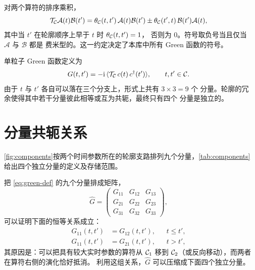 对两个算符的排序乘积，
\begin{equation}
    \mathcal{T}_{\mathcal{C}}\mathcal{A}(t)\mathcal{B}(t')
    =
    \theta_{\mathcal{C}}(t,t')\,\mathcal{A}(t)\mathcal{B}(t')
    \pm
    \theta_{\mathcal{C}}(t',t)\,\mathcal{B}(t')\mathcal{A}(t),
\end{equation}
其中当 $t'$ 在轮廓顺序上早于 $t$ 时 $\theta_{\mathcal{C}}(t,t')=1$，
否则为 $0$。符号取负号当且仅当 $\mathcal{A}$ 与 $\mathcal{B}$ 都是
费米型的。这一约定决定了本库中所有 Green 函数的符号。

单粒子 Green 函数定义为
\begin{equation}
    G(t,t') = -\mathrm{i}\,\langle \mathcal{T}_{\mathcal{C}}\,
              c(t)\,c^{\dagger}(t')\rangle,
    \qquad t,t'\in\mathcal{C} .
    \label{eq:green-def}
\end{equation}
由于 $t$ 与 $t'$ 各自可以落在三个分支上，形式上共有 $3\times3=9$ 个
分量。轮廓的冗余使得其中若干分量彼此相等或互为共轭，最终只有四个
分量是独立的。

\section{分量共轭关系}
\label{sec:components}

\cref{fig:components}按两个时间参数所在的轮廓支路排列九个分量，\cref{tab:components}给出四个独立分量的定义及存储范围。

把 \cref{eq:green-def} 的九个分量排成矩阵，
\begin{equation}
    \hat{G} =
    \begin{pmatrix}
        G_{11} & G_{12} & G_{13}\\
        G_{21} & G_{22} & G_{23}\\
        G_{31} & G_{32} & G_{33}
    \end{pmatrix},
\end{equation}
可以证明下面的恒等关系成立：
\begin{align}
    G_{11}(t,t') &= G_{12}(t,t'), && t\le t', \label{eq:redundancy1}\\
    G_{11}(t,t') &= G_{21}(t,t'), && t> t', \label{eq:redundancy2}
\end{align}
其原因是：可以把具有较大实时参数的算符从 $\mathcal{C}_1$ 移到
$\mathcal{C}_2$（或反向移动），而两者在算符右侧的演化恰好抵消。
利用这组关系，$\hat G$ 可以压缩成下面四个独立分量。

